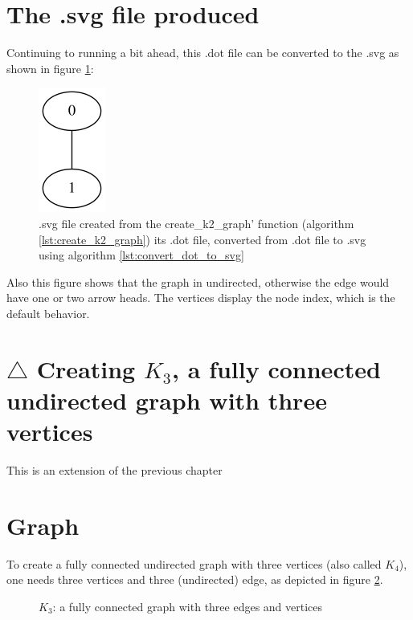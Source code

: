 \section{The .svg file produced}
\label{subsec:create_k2.svg}

Continuing to running a bit ahead, 
this .dot file can be converted to the .svg 
as shown in figure \ref{fig:create_k2_graph.svg}:

\begin{figure}[!htbp]
  \includegraphics[]{create_k2_graph.png}
  \caption{.svg file created from the create\_k2\_graph' function (algorithm \ref{lst:create_k2_graph}) its .dot file, converted from .dot file to .svg using algorithm \ref{lst:convert_dot_to_svg}}
  \label{fig:create_k2_graph.svg}
\end{figure}

Also this figure shows that the graph in undirected, otherwise the edge
 would have one or two arrow heads.
 The vertices display the node index, which is the default behavior.

\section{$\triangle$ Creating $K_{3}$, a fully connected undirected graph with three vertices}
\label{subsec:create_k3_graph}

This is an extension of the previous chapter

\section{Graph}

To create a fully connected undirected graph with three vertices 
(also called $K_{4}$), 
one needs three vertices and three (undirected) edge, 
as depicted in figure \ref{fig:create_k3_graph}.

\begin{figure}
  \caption{$K_{3}$: a fully connected graph with three edges and vertices }
  \label{fig:create_k3_graph}
\end{figure}

